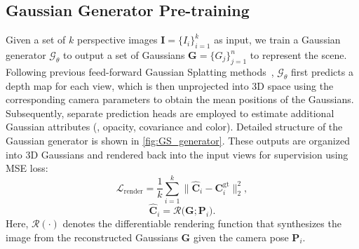 \subsection{Gaussian Generator Pre-training}
\label{subsec:GS_generator}
Given a set of $k$ perspective images $\mathbf{I} = \{I_i\}_{i=1}^k$ as input, we train a Gaussian generator $\mathcal{G}_\theta$ to output a set of Gaussians $\mathbf{G} = \{G_j\}_{j=1}^{n}$ to represent the scene. 
Following previous feed-forward Gaussian Splatting methods~\cite{charatan2024pixelsplat,chen2024mvsplat,xu2025depthsplat}, 
$\mathcal{G}_\theta$ first predicts a depth map for each view, which is then unprojected into 3D space using the corresponding camera parameters to obtain the mean positions of the Gaussians. 
Subsequently, separate prediction heads are employed to estimate additional Gaussian attributes (\ie, opacity, covariance and color).
Detailed structure of the Gaussian generator is shown in \cref{fig:GS_generator}.
These outputs are organized into 3D Gaussians and rendered back into the input views for supervision using MSE loss:
\begin{equation}
    \mathcal{L}_{\text{render}} =
    \frac{1}{k} \sum_{i=1}^{k} 
    \| \widehat{\mathbf{C}}_i - \mathbf{C}_i^{\text{gt}} \|_2^2,
\end{equation}
\begin{equation}
    \widehat{\mathbf{C}}_i = 
    \mathcal{R}\big(\mathbf{G}; \mathbf{P}_i\big).
\end{equation}
Here, $\mathcal{R}(\cdot)$ denotes the differentiable rendering function that synthesizes the image 
from the reconstructed Gaussians $\mathbf{G}$ given the camera pose $\mathbf{P}_i$.

